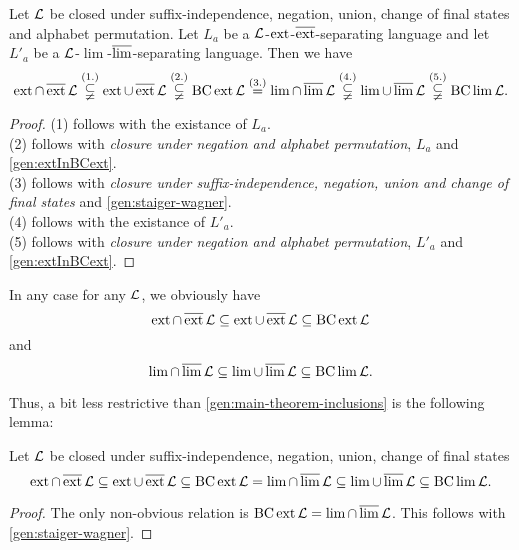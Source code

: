 \begin{theorem}
\label{gen:main-theorem-inclusions}
Let $\mathcal{L}$ be closed under suffix-independence, negation, union, change of final states and alphabet permutation.
Let $L_a$ be a $\mathcal{L}$-$\operatorname{ext}$-$\operatorname{\overline{ext}}$-separating language and let $L'_a$ be a $\mathcal{L}$-$\lim$-$\operatorname{\overline{lim}}$-separating language.
Then we have
\[ \operatorname{ext} \cap \operatorname{\overline{ext}} \mathcal{L} \stackrel{(1.)}\subsetneqq
\operatorname{ext} \cup \operatorname{\overline{ext}} \mathcal{L} \stackrel{(2.)}\subsetneqq
\operatorname{BC} \operatorname{ext} \mathcal{L} \stackrel{(3.)}=
\lim \cap \operatorname{\overline{lim}} \mathcal{L} \stackrel{(4.)}\subsetneqq
\lim \cup \operatorname{\overline{lim}} \mathcal{L} \stackrel{(5.)}\subsetneqq
\operatorname{BC} \lim \mathcal{L} . \]
\begin{proof}
(1) follows with the existance of $L_a$. \\
(2) follows with \emph{closure under negation and alphabet permutation}, $L_a$ and \cref{gen:extInBCext}. \\
(3) follows with \emph{closure under suffix-independence, negation, union and change of final states} and \cref{gen:staiger-wagner}. \\
(4) follows with the existance of $L'_a$. \\
(5) follows with \emph{closure under negation and alphabet permutation}, $L'_a$ and \cref{gen:extInBCext}.
\end{proof}
\end{theorem}

In any case for any $\mathcal{L}$, we obviously have
\[ \operatorname{ext} \cap \operatorname{\overline{ext}} \mathcal{L} \subseteq
\operatorname{ext} \cup \operatorname{\overline{ext}} \mathcal{L} \subseteq
\operatorname{BC} \operatorname{ext} \mathcal{L} \]
and
\[ \lim \cap \operatorname{\overline{lim}} \mathcal{L} \subseteq
\lim \cup \operatorname{\overline{lim}} \mathcal{L} \subseteq
\operatorname{BC} \lim \mathcal{L} . \]

Thus, a bit less restrictive than \cref{gen:main-theorem-inclusions} is the following lemma:
\begin{lemma}
Let $\mathcal{L}$ be closed under suffix-independence, negation, union, change of final states\[ \operatorname{ext} \cap \operatorname{\overline{ext}} \mathcal{L} \subseteq
\operatorname{ext} \cup \operatorname{\overline{ext}} \mathcal{L} \subseteq
\operatorname{BC} \operatorname{ext} \mathcal{L} =
\lim \cap \operatorname{\overline{lim}} \mathcal{L} \subseteq
\lim \cup \operatorname{\overline{lim}} \mathcal{L} \subseteq
\operatorname{BC} \lim \mathcal{L} . \]
\begin{proof}
The only non-obvious relation is $\operatorname{BC} \operatorname{ext} \mathcal{L} = \lim \cap \operatorname{\overline{lim}} \mathcal{L}$. This follows with \cref{gen:staiger-wagner}.
\end{proof}
\end{lemma}



